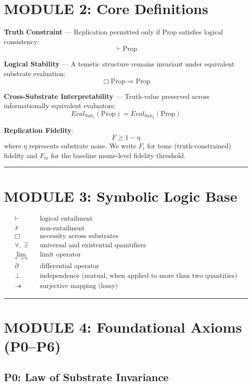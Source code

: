 \documentclass{article}
\newcommand{\Prop}{\mathrm{Prop}}
\newcommand{\Sub}{\mathrm{Sub}}
\begin{document}
\section*{MODULE 2: Core Definitions}

\textbf{Truth Constraint} --- Replication permitted only if $\Prop$ satisfies logical
consistency:
\[ \vdash \Prop \]

\textbf{Logical Stability} --- A temetic structure remains invariant under equivalent
substrate evaluation:
\[ \Box \Prop \Rightarrow \Prop \]

\textbf{Cross-Substrate Interpretability} --- Truth-value preserved across
informationally equivalent evaluators:
\[ Eval_{\Sub_1}(\Prop) = Eval_{\Sub_2}(\Prop) \]

\textbf{Replication Fidelity}:
\[ F \ge 1 - \eta \]
where $\eta$ represents substrate noise.
We write $F_t$ for teme (truth-constrained) fidelity and $F_m$ for the baseline meme-level fidelity threshold.

\bigskip
\hrule
\bigskip

\section*{MODULE 3: Symbolic Logic Base}

\begin{align*}
    \vdash \quad   & \text{logical entailment} \\
    \not\vdash \quad & \text{non-entailment} \\
    \Box \quad     & \text{necessity across substrates} \\
    \forall,\ \exists \quad & \text{universal and existential quantifiers} \\
    \lim_{x \to a} \quad & \text{limit operator} \\
    \partial \quad & \text{differential operator} \\
    \perp \quad    & \text{independence (mutual, when applied to more than two quantities)} \\
    \twoheadrightarrow \quad & \text{surjective mapping (lossy)}
\end{align*}

\bigskip
\hrule
\bigskip

\section*{MODULE 4: Foundational Axioms (P0--P6)}

\subsection*{P0: Law of Substrate Invariance}
\end{document}
